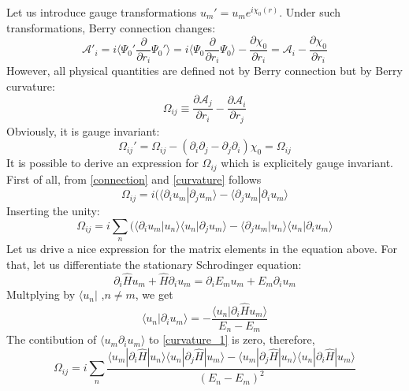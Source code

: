\documentclass{article}
\begin{document}
Let us introduce gauge transformations $u_m' = u_m e^{i\chi_0(r)}$. Under such
transformations, Berry connection changes:
\begin{equation}
    \mathcal{A'}_i = i\langle \Psi_0' \frac{\partial}{\partial r_i}\Psi_0'\rangle = 
                    i\langle \Psi_0 \frac{\partial}{\partial r_i}\Psi_0\rangle - 
                    \frac{\partial \chi_0}{\partial r_i} = 
                    \mathcal{A}_i  - \frac{\partial \chi_0}{\partial r_i}
\end{equation}
However, all physical quantities are defined not by Berry connection but by Berry curvature:
\begin{equation}
    \label{curvature}
    \Omega_{ij} \equiv \frac{\partial \mathcal{A}_j}{\partial r_i} - 
                        \frac{\partial \mathcal{A}_i}{\partial r_j}
\end{equation}
Obviously, it is gauge invariant:
\begin{equation}
    \Omega_{ij}' = \Omega_{ij} - (\partial_i \partial_j - \partial_j \partial_i)\chi_0 = 
                   \Omega_{ij} 
\end{equation}
It is possible to derive an expression for $\Omega_{ij}$ which is explicitely gauge invariant.
First of all, from \eqref{connection} and \eqref{curvature} follows
\begin{equation}
    \Omega_{ij} = i(\langle \partial_i u_m | \partial_j u_m \rangle - 
                    \langle \partial_j u_m | \partial_i u_m \rangle 
\end{equation}
Inserting the unity:
\begin{equation}
    \label{curvature_1}
    \Omega_{ij} = i\sum_n(\langle \partial_i u_m | u_n \rangle  
                    \langle u_n | \partial_j u_m \rangle - 
                    \langle \partial_j u_m | u_n \rangle  
                    \langle u_n | \partial_i u_m \rangle 
\end{equation}
Let us drive a nice expression for the matrix elements in the equation above. For that, 
let us differentiate the stationary Schrodinger equation:
\begin{equation}
    \partial_i \hat{H} u_m + \hat{H} \partial_i u_m = \partial_iE_m u_m + E_m \partial_i u_m
\end{equation}
Multplying by $\langle u_n |$ ,$n\ne m$, we get
\begin{equation}
    \langle u_n | \partial_i u_m \rangle = -\frac{\langle u_n | \partial_i \hat{H} 
                                            u_m \rangle}{E_n - E_m}
\end{equation}
The contibution of $\langle u_m \partial_i u_m \rangle$ to \eqref{curvature_1} is zero,
therefore,
\begin{equation}
    \Omega_{ij} = i\sum_{n} \frac{\langle u_m | \partial_i\hat{H} | u_n \rangle 
                                  \langle u_n | \partial_j\hat{H} | u_m \rangle - 
                                  \langle u_m | \partial_j\hat{H} | u_n \rangle 
                                  \langle u_n | \partial_i\hat{H} | u_m \rangle} 
                                  {(E_n - E_m)^2}
\end{equation}
\end{document}
